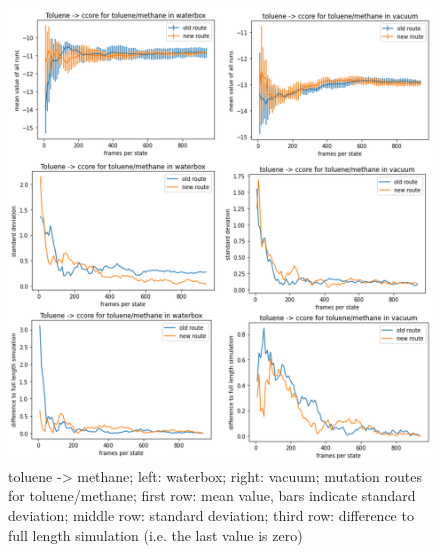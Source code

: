 \begin{figure}[!htb]
	
	\includegraphics[scale=0.9]{toluene_short}\caption{toluene -> methane; left: waterbox; right: vacuum; mutation routes for toluene/methane; first row: mean value, bars indicate standard deviation; middle row: standard deviation; third row: difference to full length simulation (i.e. the last value is zero)}
		\label{fig:toluene_short}
\end{figure}

